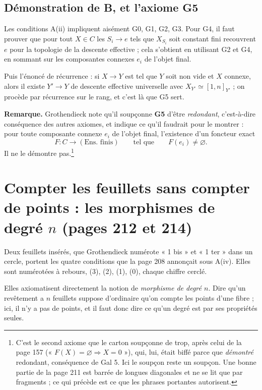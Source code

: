 \documentclass[11pt,a4paper]{article}
\begin{document}
\subsection*{Démonstration de B, et l'axiome G5}

Les conditions A(ii) impliquent aisément G0, G1, G2, G3. Pour G4, il faut
prouver que pour tout $X \in C$ les $S_{i} \to e$ tels que $X_{S_{i}}$ soit
constant fini recouvrent $e$ pour la topologie de la descente effective ;
cela s'obtient en utilisant G2 et G4, en sommant sur les composantes connexes
$e_{i}$ de l'objet final.

Puis l'énoncé de récurrence : si $X \to Y$ est tel que $Y$ soit non vide et $X$
connexe, alors il existe $Y' \to Y$ de descente effective universelle avec
$X_{Y'} \simeq [1,n]_{Y'}$ ; on procède par récurrence sur le rang, et c'est
là que G5 sert.

\textbf{Remarque.} Grothendieck note qu'il soupçonne \textbf{G5} d'être
\emph{redondant}, c'est-à-dire conséquence des autres axiomes, et indique ce
qu'il faudrait pour le montrer : pour toute composante connexe $e_{i}$ de
l'objet final, l'existence d'un foncteur exact
\[
  F : C \longrightarrow (\text{Ens.\ finis}) \qquad \text{tel que}
  \qquad F(e_{i}) \neq \varnothing .
\]
Il ne le démontre pas.\footnote{C'est le second axiome que le carton
soupçonne de trop, après celui de la page 157 (« $F(X) = \varnothing
\Rightarrow X = 0$ »), qui, lui, était biffé parce que \emph{démontré}
redondant, conséquence de Gal 5. Ici le soupçon reste un soupçon. Une bonne
partie de la page 211 est barrée de longues diagonales et ne se lit que par
fragments ; ce qui précède est ce que les phrases portantes autorisent.}

\section*{Compter les feuillets sans compter de points : les morphismes de degré $n$ (pages 212 et 214)}

Deux feuillets insérés, que Grothendieck numérote « 1 bis » et « 1 ter » dans
un cercle, portent les quatre conditions que la page 208 annonçait sous A(iv).
Elles sont numérotées à rebours, (3), (2), (1), (0), chaque chiffre
cerclé.

Elles axiomatisent directement la notion de \emph{morphisme de degré $n$}. Dire qu'un revêtement a
$n$ feuillets suppose d'ordinaire qu'on compte les points d'une fibre ; ici, il
n'y a pas de points, et il faut donc dire ce qu'un degré est par ses
propriétés seules.
\end{document}
